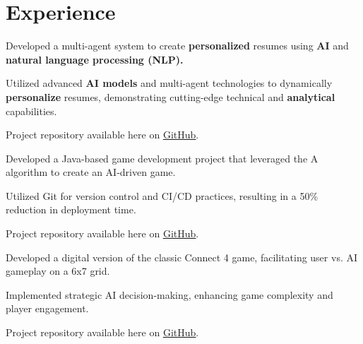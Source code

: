 \section{Experience}


    \begin{tightemize}
        \item Developed a multi-agent system to create \textbf{personalized} resumes using \textbf{AI} and \textbf{natural language processing (NLP).}
        \item Utilized advanced \textbf{AI models} and multi-agent technologies to dynamically \textbf{personalize} resumes, demonstrating cutting-edge technical and \textbf{analytical} capabilities.
        \item Project repository available here on \href{https://github.com/vmsaif/ats-pass-ai}{\ul{GitHub}}. 
    \end{tightemize}



    \begin{tightemize}
        \item Developed a Java-based game development project that leveraged the A\* algorithm to create an AI-driven game. 
        \item Utilized Git for version control and CI/CD practices, resulting in a 50\% reduction in deployment time.
        \item Project repository available here on \href{https://github.com/vmsaif/ant-path-finding-using-A-Star-algorithm}{\ul{GitHub}}.
    \end{tightemize}



    \begin{tightemize}
        \item Developed a digital version of the classic Connect 4 game, facilitating user vs. AI gameplay on a 6x7 grid.
        \item Implemented strategic AI decision-making, enhancing game complexity and player engagement.
        \item Project repository available here on \href{https://github.com/vmsaif/connect4-with-minimax-algorithm-in-java}{\ul{GitHub}}.
    \end{tightemize}
